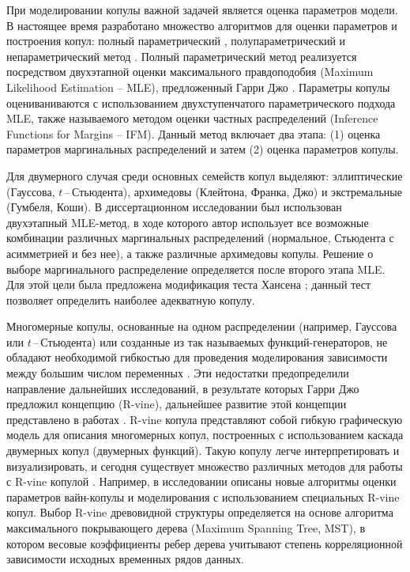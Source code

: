 При моделировании копулы важной задачей является оценка параметров модели.
В настоящее время разработано множество алгоритмов для оценки параметров и построения копул:
полный параметрический \cite{Patton2006}, полупараметрический \cite {Chen2006, Lourme2016} и непараметрический метод \cite{Fermanian2003, Kim2007}. 
Полный параметрический метод реализуется посредством двухэтапной оценки максимального правдоподобия (Maximum Likelihood Estimation -- MLE), предложенный Гарри Джо \cite{Joe1997, Joe2014}.
Параметры копулы оцениваниваются с использованием двухступенчатого параметрического подхода MLE, также называемого методом оценки частных распределений (Inference Functions for Margins -- IFM). 
Данный метод включает два этапа: (1) оценка параметров маргинальных распределений и затем (2) оценка параметров копулы.

Для двумерного случая среди основных семейств копул выделяют: эллиптические (Гауссова, $t$\,--\,Стьюдента), архимедовы (Клейтона, Франка, Джо) и экстремальные (Гумбеля, Коши).
В диссертационном исследовании \cite{Xu2008} был использован двухэтапный MLE-метод, в ходе которого автор использует все возможные комбинации различных маргинальных распределений (нормальное, Стьюдента с асимметрией и без нее), а также различные архимедовы копулы. %
Решение о выборе маргинального распределение определяется после второго этапа MLE. 
Для этой цели была предложена модификация теста Хансена \cite{Hansen2005}; данный тест позволяет определить наиболее адекватную копулу.

Многомерные копулы, основанные на одном распределении (например, Гауссова или $t$\,--\,Стьюдента) или созданные из так называемых функций-генераторов, не обладают необходимой гибкостью для проведения моделирования зависимости между большим числом переменных \cite{Brechmann2013}. Эти недостатки предопределили направление дальнейших исследований, в результате которых Гарри Джо \cite{Joe1996} предложил  концепцию  (R-vine), дальнейшее развитие этой концепции представлено в работах \cite{Brechmann2013, Cooke2015}.
R-vine копула представляют собой гибкую графическую модель для описания многомерных копул, построенных с использованием каскада двумерных копул (двумерных функций). 
Такую копулу легче интерпретировать и визуализировать, и сегодня существует множество различных методов для работы с R-vine копулой \cite{Cooke2015, Czado2010, Dissmann2013}.
Например, в исследовании \cite{Dissmann2013} описаны новые алгоритмы оценки параметров вайн-копулы и моделирования с использованием специальных R-vine копул.
Выбор R-vine древовидной структуры определяется на основе алгоритма максимального покрывающего дерева (Maximum Spanning Tree, MST), в котором весовые коэффициенты ребер дерева учитывают степень корреляционной зависимости исходных временных рядов данных.

